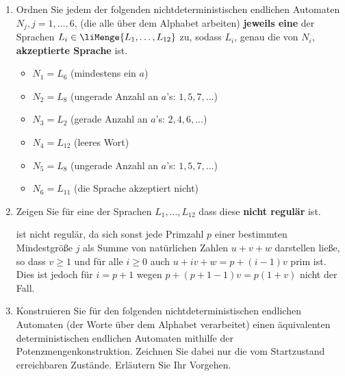 \documentclass{lehramt-informatik-aufgabe}
\begin{document}
\begin{enumerate}

\item Ordnen Sie jedem der folgenden nichtdeterministischen endlichen
Automaten $N_j, j = 1,\dots,6$, (die alle über dem Alphabet
 arbeiten) \textbf{jeweils eine} der Sprachen $L_i \in
\liMenge{L_1, \dots , L_{12}}$ zu, sodass $L_i$, genau die von $N_i$,
\textbf{akzeptierte Sprache} ist.

\begin{liAntwort}
\begin{itemize}
\item $N_1 = L_6$ (mindestens ein $a$)

\item $N_2 = L_8$ (ungerade Anzahl an $a$’s: $1, 5, 7, \dots$)

\item $N_3 = L_2$ (gerade Anzahl an $a$’s: $2, 4, 6, \dots$)

\item $N_4 = L_{12}$ (leeres Wort)

\item $N_5 = L_8$ (ungerade Anzahl an $a$’s: $1, 5, 7, \dots$)

\item $N_6 = L_11$ (die Sprache akzeptiert nicht)
\end{itemize}
\end{liAntwort}


\item Zeigen Sie für eine der Sprachen $L_1, \dots, L_{12}$ dass diese
\textbf{nicht regulär} ist.

\begin{liAntwort}

ist nicht regulär, da sich sonst jede Primzahl $p$ einer bestimmten
Mindestgröße $j$ als Summe von natürlichen Zahlen $u + v + w$ darstellen
ließe, so dass $v \geq 1$ und für alle $i \geq 0$ auch $u + iv + w = p +
(i − 1)v$ prim ist. Dies ist jedoch für $i = p + 1$ wegen $p + (p + 1 −
1)v = p(1 + v)$ nicht der
Fall.
\end{liAntwort}


\item Konstruieren Sie für den folgenden nichtdeterministischen
endlichen Automaten (der Worte über dem Alphabet 
verarbeitet) einen äquivalenten deterministischen endlichen Automaten
mithilfe der Potenzmengenkonstruktion. Zeichnen Sie dabei nur die vom
Startzustand erreichbaren Zustände. Erläutern Sie Ihr Vorgehen.


\end{enumerate}
\end{document}

